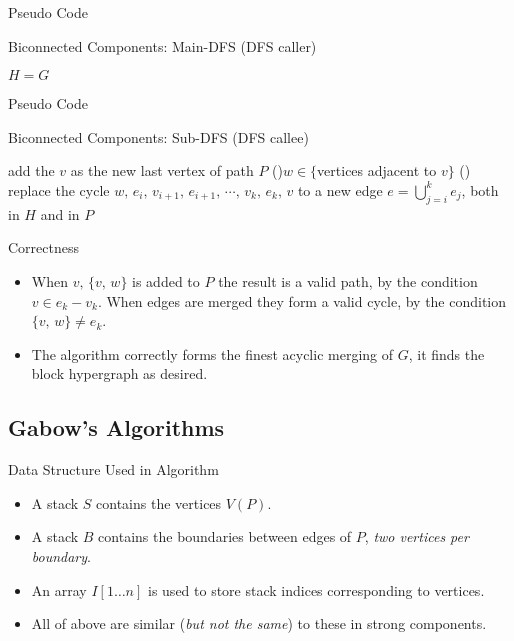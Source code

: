 \documentclass{beamer}
\begin{document}
\begin{frame}{Pseudo Code}
	\SetAlFnt{\small}
	\begin{algorithm}[H]
		\caption{Biconnected Components: Main-DFS (DFS caller)}
		$H=G$\;
	\end{algorithm}
\end{frame}

\begin{frame}{Pseudo Code}
	\SetAlFnt{\small}
	\begin{algorithm}[H]
		\caption{Biconnected Components: Sub-DFS (DFS callee)}
		add the $v$ as the new last vertex of path $P$\;
		\For(){$w\in \{$vertices adjacent to $v\}$}{
			\Else(){
				replace the cycle $w,\,e_i,\,v_{i+1},\,e_{i+1},\,\cdots,\,v_k,\,e_k,\,v$
				to a new edge $e=\bigcup_{j=i}^ke_j$, both in $H$ and in $P$\;
			}
		}
	\end{algorithm}
\end{frame}

\begin{frame}{Correctness}
	\begin{itemize}
		\item
		When $v,\,\{v,\,w\}$ is added to $P$ the result is a valid path, by the
		condition $v\in e_k-v_k$. When edges are merged they form a valid cycle,
		by the condition $\{v,\,w\}\neq e_k$.
		\item
		The algorithm correctly forms the finest acyclic merging of $G$, it finds
		the block hypergraph as desired.
	\end{itemize}
\end{frame}

\subsection{Gabow's Algorithms}

\begin{frame}{Data Structure Used in Algorithm}
	\begin{itemize}
		\item
		A \alert{stack $S$} contains the vertices $V(P)$.
		\item
		A \alert{stack $B$} contains the boundaries between edges of $P$, \emph{two vertices per boundary}.
		\item
		An array \alert{$I[1\ldots n]$} is used to store stack indices corresponding to vertices.
		\item
		All of above are similar (\emph{but not the same}) to these in strong components.
	\end{itemize}
\end{frame}
\end{document}
